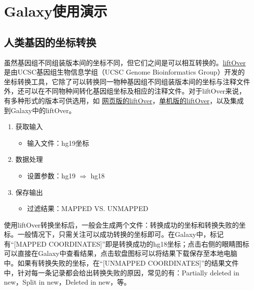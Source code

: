\documentclass[11pt,a4paper,twoside]{book}
\begin{document}
\section{Galaxy使用演示}
\subsection{人类基因的坐标转换}
虽然基因组不同组装版本间的坐标不同，但它们之间是可以相互转换的。\href{http://genome.ucsc.edu/cgi-bin/hgLiftOver}{liftOver} 是由UCSC基因组生物信息学组（UCSC Genome Bioinformatics Group）开发的坐标转换工具，它除了可以转换同一物种基因组不同组装版本间的坐标与注释文件外，还可以在不同物种间转化基因组坐标及相应的注释文件。对于liftOver来说，有多种形式的版本可供选用，如 \href{http://genome.ucsc.edu/cgi-bin/hgLiftOver}{网页版的liftOver}，\href{http://hgdownload.cse.ucsc.edu/downloads.html\#source\_downloads}{单机版的liftOver}，以及集成到Galaxy中的liftOver。
\begin{enumerate}
    \item 获取输入
      \begin{itemize}
        \item 输入文件：hg19坐标
      \end{itemize}
    \item 数据处理
      \begin{itemize}
        \item 设置参数：hg19 $\Rightarrow$ hg18
      \end{itemize}
    \item 保存输出
      \begin{itemize}
        \item 过滤结果：MAPPED VS. UNMAPPED
      \end{itemize}
\end{enumerate}

使用liftOver转换坐标后，一般会生成两个文件：转换成功的坐标和转换失败的坐标。一般情况下，只需关注可以成功转换的坐标即可。在Galaxy中，标记有“[MAPPED COORDINATES]”即是转换成功的hg18坐标；点击右侧的眼睛图标可以直接在Galaxy中查看结果，点击软盘图标可以将结果下载保存至本地电脑中。如果有转换失败的坐标，在“[UNMAPPED COORDINATES]”的结果文件中，针对每一条记录都会给出转换失败的原因，常见的有：Partially deleted in new，Split in new，Deleted in new，等。
\end{document}
